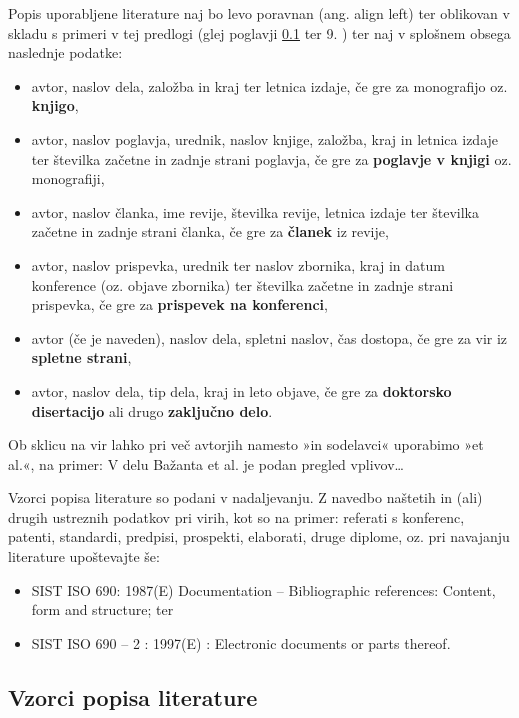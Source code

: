 Popis uporabljene literature naj bo levo poravnan (ang. align left) ter oblikovan v skladu s primeri v tej predlogi (glej poglavji \ref{sec:vzorci_lit}  ter 9. \refname{}) ter naj v splošnem obsega naslednje podatke:
\begin{itemize}
	\item avtor, naslov dela, založba in kraj ter letnica izdaje, če gre za monografijo oz. \textbf{knjigo},
	\item avtor, naslov poglavja, urednik, naslov knjige, založba, kraj in letnica izdaje ter številka začetne in zadnje strani poglavja, če gre za \textbf{poglavje v knjigi} oz. monografiji,
	\item avtor, naslov članka, ime revije, številka revije, letnica izdaje ter številka začetne in zadnje strani članka, če gre za \textbf{članek} iz revije,
	\item avtor, naslov prispevka, urednik ter naslov zbornika, kraj in datum konference (oz. objave zbornika) ter številka začetne in zadnje strani prispevka, če gre za \textbf{prispevek na konferenci},
	\item avtor (če je naveden), naslov dela, spletni naslov, čas dostopa, če gre za vir iz \textbf{spletne strani},
	\item avtor, naslov dela, tip dela, kraj in leto objave, če gre za \textbf{doktorsko disertacijo} ali drugo \textbf{zaključno delo}.
\end{itemize}

Ob sklicu na vir lahko pri več avtorjih namesto »in sodelavci« uporabimo »et al.«, na primer: V delu Bažanta et al. \cite{bazant_1991} je podan pregled vplivov\ldots

Vzorci popisa literature so podani v nadaljevanju. Z navedbo naštetih in (ali) drugih ustreznih podatkov pri virih, kot so na primer: referati s konferenc, patenti, standardi, predpisi, prospekti, elaborati, druge diplome, oz. pri navajanju literature upoštevajte še:
\begin{itemize}
	\item SIST ISO 690: 1987(E) Documentation – Bibliographic references: Content, form and structure; ter
	\item SIST ISO 690 – 2 : 1997(E) : Electronic documents or parts thereof.
\end{itemize}


\subsection{Vzorci popisa literature}\label{sec:vzorci_lit}

